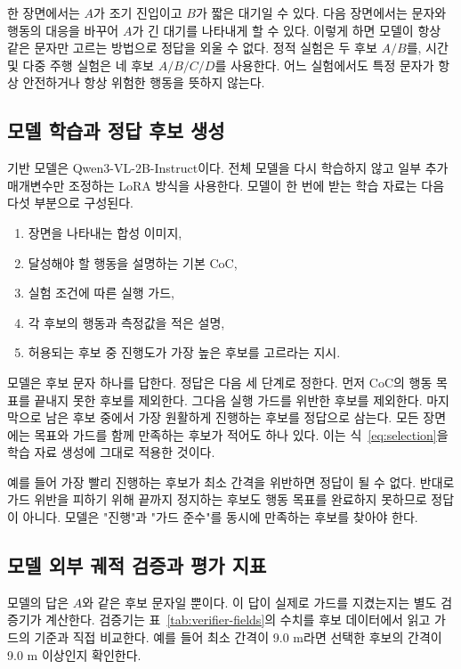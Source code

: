 한 장면에서는 $A$가 조기 진입이고 $B$가 짧은 대기일 수 있다. 다음 장면에서는 문자와 행동의 대응을 바꾸어 $A$가 긴 대기를 나타내게 할 수 있다. 이렇게 하면 모델이 항상 같은 문자만 고르는 방법으로 정답을 외울 수 없다. 정적 실험은 두 후보 $A/B$를, 시간 및 다중 주행 실험은 네 후보 $A/B/C/D$를 사용한다. 어느 실험에서도 특정 문자가 항상 안전하거나 항상 위험한 행동을 뜻하지 않는다.

\subsection{모델 학습과 정답 후보 생성}

기반 모델은 Qwen3-VL-2B-Instruct이다. 전체 모델을 다시 학습하지 않고 일부 추가 매개변수만 조정하는 LoRA 방식을 사용한다. 모델이 한 번에 받는 학습 자료는 다음 다섯 부분으로 구성된다.

\begin{enumerate}
\item 장면을 나타내는 합성 이미지,
\item 달성해야 할 행동을 설명하는 기본 CoC,
\item 실험 조건에 따른 실행 가드,
\item 각 후보의 행동과 측정값을 적은 설명,
\item 허용되는 후보 중 진행도가 가장 높은 후보를 고르라는 지시.
\end{enumerate}

모델은 후보 문자 하나를 답한다. 정답은 다음 세 단계로 정한다. 먼저 CoC의 행동 목표를 끝내지 못한 후보를 제외한다. 그다음 실행 가드를 위반한 후보를 제외한다. 마지막으로 남은 후보 중에서 가장 원활하게 진행하는 후보를 정답으로 삼는다. 모든 장면에는 목표와 가드를 함께 만족하는 후보가 적어도 하나 있다. 이는 식~\eqref{eq:selection}을 학습 자료 생성에 그대로 적용한 것이다.

예를 들어 가장 빨리 진행하는 후보가 최소 간격을 위반하면 정답이 될 수 없다. 반대로 가드 위반을 피하기 위해 끝까지 정지하는 후보도 행동 목표를 완료하지 못하므로 정답이 아니다. 모델은 "진행"과 "가드 준수"를 동시에 만족하는 후보를 찾아야 한다.

\subsection{모델 외부 궤적 검증과 평가 지표}

모델의 답은 $A$와 같은 후보 문자일 뿐이다. 이 답이 실제로 가드를 지켰는지는 별도 검증기가 계산한다. 검증기는 표~\ref{tab:verifier-fields}의 수치를 후보 데이터에서 읽고 가드의 기준과 직접 비교한다. 예를 들어 최소 간격이 9.0 m라면 선택한 후보의 간격이 9.0 m 이상인지 확인한다.

